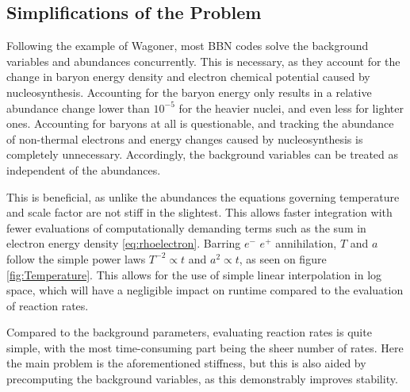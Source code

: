 \subsection{Simplifications of the Problem}
Following the example of Wagoner, most BBN codes solve the background variables and abundances concurrently. This is necessary, as they account for the change in baryon energy density and electron chemical potential caused by nucleosynthesis. Accounting for the baryon energy only results in a relative abundance change lower than $10^{-5}$ for the heavier nuclei, and even less for lighter ones. Accounting for baryons at all is questionable, and tracking the abundance of non-thermal electrons and energy changes caused by nucleosynthesis is completely unnecessary. Accordingly, the background variables can be treated as independent of the abundances.

This is beneficial, as unlike the abundances the equations governing temperature and scale factor are not stiff in the slightest. This allows faster integration with fewer evaluations of computationally demanding terms such as the sum in electron energy density \cref{eq:rhoelectron}. Barring $e^-$ $e^+$ annihilation, $T$ and $a$ follow the simple power laws $T^{-2}\propto t$ and $a^2\propto t$, as seen on figure \ref{fig:Temperature}. This allows for the use of simple linear interpolation in log space, which will have a negligible impact on runtime compared to the evaluation of reaction rates.

Compared to the background parameters, evaluating reaction rates is quite simple, with the most time-consuming part being the sheer number of rates. Here the main problem is the aforementioned stiffness, but this is also aided by precomputing the background variables, as this demonstrably improves stability.


